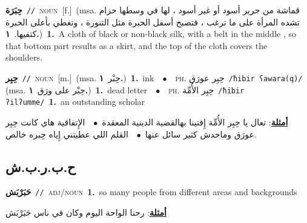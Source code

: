 \documentclass[10pt,a4paper,twoside]{article} %
\begin{document}
\begin{multicols}{2}
{\setlength\topsep{0pt}\textbf{\foreignlanguage{arabic}{حِبَرَة}}\ {\color{gray}\texttt{//}\color{black}}\ \textsc{noun}\ [f.]\ \color{gray}(msa. \foreignlanguage{arabic}{قماشة من حرير أسود أو غير أسود ، لها في وسطها حزام تشده المرأة على ما ترغب ، فتصبح أسفل الحبرة مثل التنورة ، وتغطي بأعلى الحبرة كتفيها.}~\foreignlanguage{arabic}{\textbf{١.}})\color{black}\ \textbf{1.}~A cloth of black or non-black silk, with a belt in the middle , so that bottom part results as a skirt, and the top of the cloth covers the shoulders.\ 

{\setlength\topsep{0pt}\textbf{\foreignlanguage{arabic}{حِبِر}}\ {\color{gray}\texttt{//}\color{black}}\ \textsc{noun}\ [m.]\ \color{gray}(msa. \foreignlanguage{arabic}{حِبْر}~\foreignlanguage{arabic}{\textbf{١.}})\color{black}\ \textbf{1.}~ink\ \ $\bullet$\ \ \textsc{ph.} \color{gray} \foreignlanguage{arabic}{حِبِر عورَق}\color{black}\ {\color{gray}\texttt{/{\sffamily ħibir ʕawara(q)}/}\color{black}}\ \color{gray} (msa. \foreignlanguage{arabic}{حِبْر على ورَق}~\foreignlanguage{arabic}{\textbf{١.}})\color{black}\ \textbf{1.}~dead letter\ \ $\bullet$\ \ \textsc{ph.} \color{gray} \foreignlanguage{arabic}{حِبِر الأُمِّة}\color{black}\ {\color{gray}\texttt{/{\sffamily ħibir ʔilʔumme}/}\color{black}}\ \textbf{1.}~an outstanding scholar\  \begin{flushright}\color{gray}\foreignlanguage{arabic}{\textbf{\underline{\foreignlanguage{arabic}{أمثلة}}}: تعال يا حِبِر الأُمِّة إِفتينا بهالقضية الدينية المعقدة\ $\bullet$\ \  الإِتفاقية هاي كانت حِبِر عورَق وماحدش كثير سائل عنها\ $\bullet$\ \  القلم اللي عطيتني إِياه حِبره خالص.}\end{flushright}\color{black}} \vspace{2mm}

\vspace{-3mm}
\subsection*{\color{blue}\foreignlanguage{arabic}{ح.ب.ر.ب.ش}\color{blue}{ (ntws)}} 

{\setlength\topsep{0pt}\textbf{\foreignlanguage{arabic}{حَبَرْبَش}}\ {\color{gray}\texttt{//}\color{black}}\ \textsc{adj/noun}\ \textbf{1.}~so many people from different areas and backgrounds\  \begin{flushright}\color{gray}\foreignlanguage{arabic}{\textbf{\underline{\foreignlanguage{arabic}{أمثلة}}}: رحنا الواحة اليوم وكان في ناس حَبَرْبَش}\end{flushright}\color{black}} \vspace{2mm}

}
\end{multicols}
\end{document}
